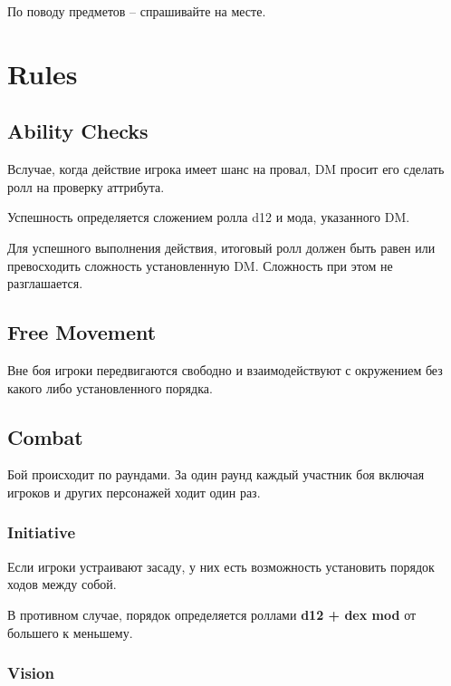 \documentclass[a5paper,11pt]{book}
\begin{document}
По поводу предметов -- спрашивайте на месте.

\begin{multicols}{2}



\end{multicols}
\chapter{Rules}
\begin{multicols}{2}

\section{Ability Checks}

\lettrine{В}{}случае, когда действие игрока имеет шанс на провал, DM просит его сделать ролл на проверку аттрибута.

Успешность определяется сложением ролла d12 и мода, указанного DM.

Для успешного выполнения действия, итоговый ролл должен быть равен или превосходить сложность установленную DM. Сложность при этом не разглашается.

\section{Free Movement}

Вне боя игроки передвигаются свободно и взаимодействуют с окружением без какого либо установленного порядка.

\section{Combat}

Бой происходит по раундами. За один раунд каждый участник боя включая игроков и других персонажей ходит один раз.

\subsection{Initiative}

Если игроки устраивают засаду, у них есть возможность установить порядок ходов между собой.

В противном случае, порядок определяется роллами \textbf{d12 + dex mod} от большего к меньшему.

\subsection{Vision}


\end{multicols}
\end{document}
